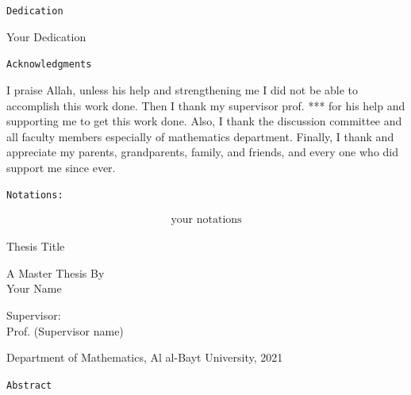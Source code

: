 \documentclass[12pt,a4paper,oneside]{book} %
\theoremstyle{definition}
\newcommand{\size}[2]{{\fontsize{#1}{0}\selectfont#2}} %
\begin{document}
\clearpage

{}	%

\centerline{\large \texttt{Dedication}}
\vfill
\begin{center}
Your Dedication
\end{center}
\vfill
\vspace{1.5in}
\clearpage

{} %

\centerline{\large \texttt{Acknowledgments}}
\vspace{0.5in}
I praise Allah, unless his help and strengthening me I did not be able to accomplish this work done. Then I thank my supervisor prof. *** for his help and supporting me to get this work done. Also, I thank the discussion committee and all faculty members especially of mathematics department. Finally, I thank and appreciate my parents, grandparents, family, and friends, and every one who did support me since ever.

\clearpage

{} %

\centerline{\large \texttt{Notations:}}
\vspace{0.5in}
\begin{align*}
\text{your notations}
\end{align*}

\clearpage

\tableofcontents

\clearpage

{} %

\centerline{\size{16}{Thesis Title}}
\vspace{0.5in}
\begin{center}
\size{14}{A Master Thesis By
\\Your Name}
\end{center}
\vspace{0.5in}
\begin{center}
\size{14}{Supervisor:
\\Prof. (Supervisor name)}
\end{center}
\vspace{0.5in}
\begin{center}
\size{14}{Department of Mathematics, Al al-Bayt University, 2021}
\end{center}
\vspace{1in}
\centerline{\size{18}{ \texttt{Abstract}}}
\vspace{0.5in}
\end{document}

